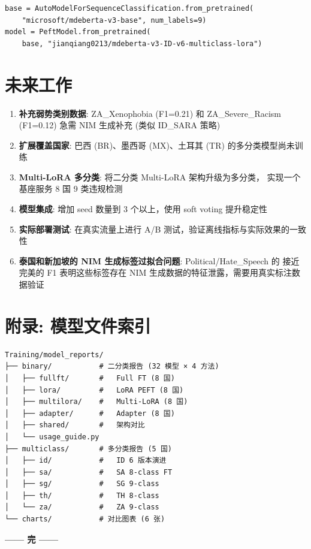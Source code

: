 \documentclass[11pt,a4paper]{article}
\begin{document}
\begin{verbatim}
base = AutoModelForSequenceClassification.from_pretrained(
    "microsoft/mdeberta-v3-base", num_labels=9)
model = PeftModel.from_pretrained(
    base, "jianqiang0213/mdeberta-v3-ID-v6-multiclass-lora")
\end{verbatim}

\section{未来工作}

\begin{enumerate}[itemsep=2pt]
\item \textbf{补充弱势类别数据}: ZA\_Xenophobia (F1=0.21) 和 ZA\_Severe\_Racism
(F1=0.12) 急需 NIM 生成补充 (类似 ID\_SARA 策略)
\item \textbf{扩展覆盖国家}: 巴西 (BR)、墨西哥 (MX)、土耳其 (TR) 的多分类模型尚未训练
\item \textbf{Multi-LoRA 多分类}: 将二分类 Multi-LoRA 架构升级为多分类，
实现一个基座服务 8 国 9 类违规检测
\item \textbf{模型集成}: 增加 seed 数量到 3 个以上，使用 soft voting 提升稳定性
\item \textbf{实际部署测试}: 在真实流量上进行 A/B 测试，验证离线指标与实际效果的一致性
\item \textbf{泰国和新加坡的 NIM 生成标签过拟合问题}: Political/Hate\_Speech 的
接近完美的 F1 表明这些标签存在 NIM 生成数据的特征泄露，需要用真实标注数据验证
\end{enumerate}

\section*{附录: 模型文件索引}

\begin{verbatim}
Training/model_reports/
├── binary/           # 二分类报告 (32 模型 × 4 方法)
│   ├── fullft/       #   Full FT (8 国)
│   ├── lora/         #   LoRA PEFT (8 国)
│   ├── multilora/    #   Multi-LoRA (8 国)
│   ├── adapter/      #   Adapter (8 国)
│   ├── shared/       #   架构对比
│   └── usage_guide.py
├── multiclass/       # 多分类报告 (5 国)
│   ├── id/           #   ID 6 版本演进
│   ├── sa/           #   SA 8-class FT
│   ├── sg/           #   SG 9-class
│   ├── th/           #   TH 8-class
│   └── za/           #   ZA 9-class
└── charts/           # 对比图表 (6 张)
\end{verbatim}

\vspace{1cm}
\begin{center}
\large\textbf{—— 完 ——}
\end{center}
\end{document}

